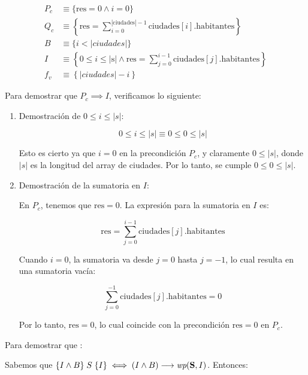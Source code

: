 \documentclass[10pt,a4paper]{article}
\begin{document}
\begin{align*}
	P_c & \equiv \{ \text{res} = 0 \land i = 0 \}                                                                                   \\
	Q_c & \equiv \left\{ \text{res} = \sum_{i=0}^{|\text{ciudades}|-1} \text{ciudades}[i].\text{habitantes} \right\}                \\
	B   & \equiv \{ i < |ciudades| \}                                                                                               \\
	I   & \equiv \left\{ 0 \leq i \leq |\text{s}| \land \text{res} = \sum_{j=0}^{i-1} \text{ciudades}[j].\text{habitantes} \right\} \\
	f_v & \equiv \left\{ |ciudades| - i \right\}
\end{align*}

Para demostrar que \( P_c \implies I \), verificamos lo siguiente:

\begin{enumerate}
	\item Demostración de \( 0 \leq i \leq |s| \):

	      \[
		      0 \leq i \leq |s| \equiv 0 \leq 0 \leq |s|
	      \]

	      Esto es cierto ya que \( i = 0 \) en la precondición \( P_c \), y claramente \( 0 \leq |s| \), donde \( |s| \) es la longitud del array de ciudades. Por lo tanto, se cumple \( 0 \leq 0 \leq |s| \).

	\item Demostración de la sumatoria en \( I \):

	      En \( P_c \), tenemos que \( \text{res} = 0 \). La expresión para la sumatoria en \( I \) es:

	      \[
		      \text{res} = \sum_{j=0}^{i-1} \text{ciudades}[j].\text{habitantes}
	      \]

	      Cuando \( i = 0 \), la sumatoria va desde \( j = 0 \) hasta \( j = -1 \), lo cual resulta en una sumatoria vacía:

	      \[
		      \sum_{j=0}^{-1} \text{ciudades}[j].\text{habitantes} = 0
	      \]

	      Por lo tanto, \( \text{res} = 0 \), lo cual coincide con la precondición \( \text{res} = 0 \) en \( P_c \).
\end{enumerate}

Para demostrar que :

Sabemos que $\hoare{I \land B}{S}{I} \iff (I \land B) \implica \wp{S}{I}$. Entonces:
\end{document}
